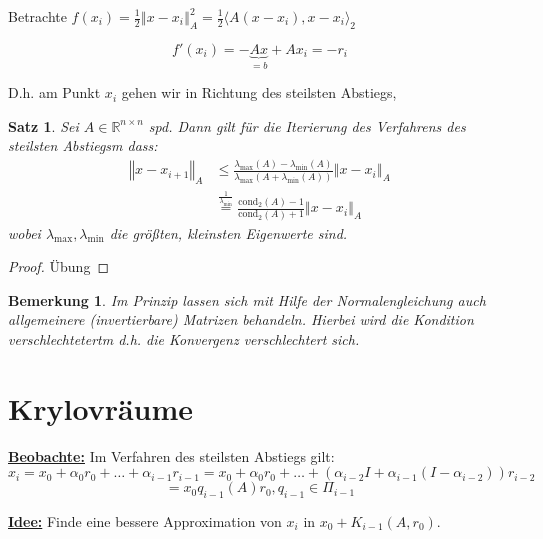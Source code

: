 \documentclass{book}
\newtheorem{theorem}[algorithm]{Satz}
\newtheorem{remark}[algorithm]{Bemerkung}
\def\R{\mathbb{R}}
\def\cond{\text{cond}}
\begin{document}
            Betrachte $f(x_i)=\frac{1}{2}\left\Vert x-x_i \right\Vert_A^2 = \frac{1}{2} \langle A(x-x_i),x-x_i \rangle_2$

            \[
                f'(x_i)=-\underbrace{Ax}_{=b}+Ax_i=-r_i    
            \]

            D.h. am Punkt $x_i$ gehen wir in Richtung des steilsten Abstiegs,

            \begin{theorem}\label{s3.7}
                Sei $A\in\R^{n\times n}$ spd. Dann gilt für die Iterierung des Verfahrens des steilsten Abstiegsm dass:
                \begin{align*}
                    \left\Vert x-x_{i+1} \right\Vert_A &\leq \frac{\lambda_{\max}(A)-\lambda_{\min}(A)}{\lambda_{\max}(A+\lambda_{\min}(A))} \left\Vert x-x_i \right\Vert_A\\
                    &\stackrel{\frac{1}{\lambda_{\min}}}{=}\frac{\cond_2(A)-1}{\cond_2(A)+1}\left\Vert x-x_i \right\Vert_A
                \end{align*}
                wobei $\lambda_{\max},\lambda_{\min}$ die größten, kleinsten Eigenwerte sind.
            \end{theorem}

            \begin{proof}
                Übung %
            \end{proof}

            \begin{remark}\label{b3.8}
                Im Prinzip lassen sich mit Hilfe der Normalengleichung auch allgemeinere (invertierbare) Matrizen behandeln. 
                Hierbei wird die Kondition verschlechtetertm d.h. die Konvergenz verschlechtert sich.
            \end{remark}

        \section{Krylovräume}

            \underline{\textbf{Beobachte:}} Im Verfahren des steilsten Abstiegs gilt:
            \[
                x_i=x_0+\alpha_0r_0+\dots+\alpha_{i-1}r_{i-1} = x_0+\alpha_0r_0+\dots+(\alpha_{i-2}I+\alpha_{i-1}(I-\alpha_{i-2}))r_{i-2}
            \]
            \[=x_0 q_{i-1}(A)r_0, q_{i-1}\in\Pi_{i-1}\]

            \underline{\textbf{Idee:}} Finde eine bessere Approximation von $x_i$ in $x_0+K_{i-1}(A,r_0)$.
\end{document}
